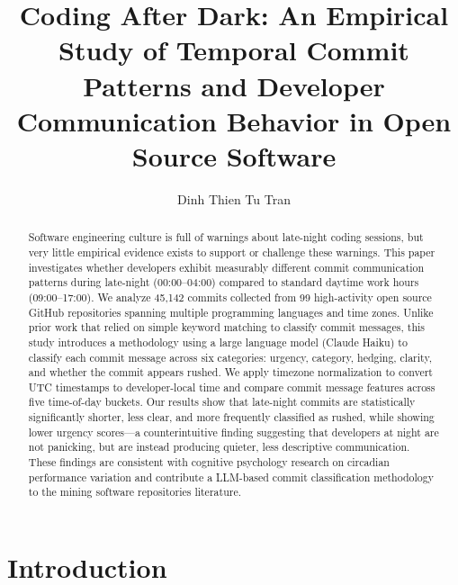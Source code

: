 \documentclass[sigconf]{acmart}
\begin{document}
\title{Coding After Dark: An Empirical Study of Temporal Commit Patterns and Developer Communication Behavior in Open Source Software}

\author{Dinh Thien Tu Tran}

\begin{abstract}
Software engineering culture is full of warnings about late-night coding sessions, but very little empirical evidence exists to support or challenge these warnings. This paper investigates whether developers exhibit measurably different commit communication patterns during late-night (00:00--04:00) compared to standard daytime work hours (09:00--17:00). We analyze 45,142 commits collected from 99 high-activity open source GitHub repositories spanning multiple programming languages and time zones. Unlike prior work that relied on simple keyword matching to classify commit messages, this study introduces a methodology using a large language model (Claude Haiku) to classify each commit message across six categories: urgency, category, hedging, clarity, and whether the commit appears rushed. We apply timezone normalization to convert UTC timestamps to developer-local time and compare commit message features across five time-of-day buckets. Our results show that late-night commits are statistically significantly shorter, less clear, and more frequently classified as rushed, while showing lower urgency scores---a counterintuitive finding suggesting that developers at night are not panicking, but are instead producing quieter, less descriptive communication. These findings are consistent with cognitive psychology research on circadian performance variation and contribute a LLM-based commit classification methodology to the mining software repositories literature.
\end{abstract}

\maketitle

\section{Introduction}
\end{document}
